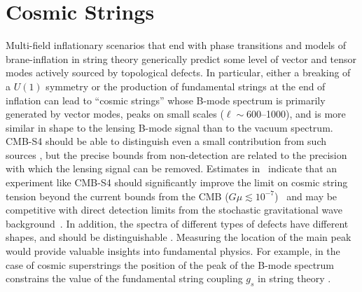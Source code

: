 
\section{Cosmic Strings}

Multi-field inflationary scenarios that end with phase transitions \cite{Hindmarsh:1994re,Vilenkin:1981iu,Kofman:1995fi,Tkachev:1998dc,Jeannerot:1995yn,Jeannerot:2003qv,Rocher:2004my} and models of brane-inflation in string theory \cite{Sarangi:2002yt,Jones:2003da,Copeland:2003bj} generically predict some level of vector and tensor modes actively sourced by topological defects. In particular, either a breaking of a $U(1)$ symmetry or the production of fundamental strings at the end of inflation can lead to ``cosmic strings'' whose B-mode spectrum is primarily generated by vector modes, peaks on small scales ($\ell\sim 600$--1000), and is more similar in shape to the lensing B-mode signal than to the vacuum spectrum. CMB-S4 should be able to distinguish even a small contribution from such sources \cite{Urrestilla:2008jv}, but the precise bounds from non-detection are related to the precision with which the lensing signal can be removed. Estimates in~\cite{Seljak:2006hi,Avgoustidis:2011ax} indicate that an experiment like CMB-S4 should significantly improve the limit on cosmic string tension beyond the current bounds from the CMB ($G\mu\lesssim10^{-7}$)~\cite{Ade:2013xla,Ade:2015ava,Ade:2015xua} and may be competitive with direct detection limits from the stochastic gravitational wave background~\cite{Arzoumanian:2015liz}. 
In addition, the spectra of different types of defects have different shapes, and should be distinguishable \cite{Urrestilla:2007sf,Avgoustidis:2011ax}. Measuring the location of the main peak would provide valuable insights into fundamental physics. For example, in the case of cosmic superstrings the position of the peak of the B-mode spectrum constrains the value of the fundamental string coupling $g_s$ in string theory \cite{Avgoustidis:2011ax}. 


